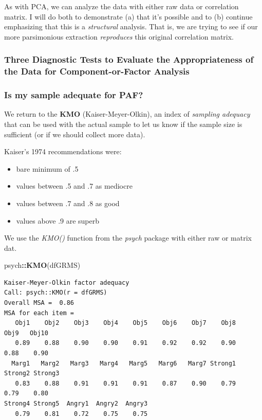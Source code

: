 \documentclass[
  english,
]{book}
\newenvironment{Shaded}{\begin{snugshade}}{\end{snugshade}}
\newcommand{\KeywordTok}[1]{\textcolor[rgb]{0.13,0.29,0.53}{\textbf{#1}}}
\newcommand{\NormalTok}[1]{#1}
\newcommand{\OperatorTok}[1]{\textcolor[rgb]{0.81,0.36,0.00}{\textbf{#1}}}
\providecommand{\tightlist}{%
  \setlength{\itemsep}{0pt}\setlength{\parskip}{0pt}}
\begin{document}
As with PCA, we can analyze the data with either raw data or correlation matrix. I will do both to demonstrate (a) that it's possible and to (b) continue emphasizing that this is a \emph{structural} analysis. That is, we are trying to see if our more parsimonious extraction \emph{reproduces} this original correlation matrix.

\hypertarget{three-diagnostic-tests-to-evaluate-the-appropriateness-of-the-data-for-component-or-factor-analysis-1}{%
\subsubsection{Three Diagnostic Tests to Evaluate the Appropriateness of the Data for Component-or-Factor Analysis}\label{three-diagnostic-tests-to-evaluate-the-appropriateness-of-the-data-for-component-or-factor-analysis-1}}

\hypertarget{is-my-sample-adequate-for-paf}{%
\subsubsection{Is my sample adequate for PAF?}\label{is-my-sample-adequate-for-paf}}

We return to the \textbf{KMO} (Kaiser-Meyer-Olkin), an index of \emph{sampling adequacy} that can be used with the actual sample to let us know if the sample size is sufficient (or if we should collect more data).

Kaiser's 1974 recommendations were:

\begin{itemize}
\tightlist
\item
  bare minimum of .5
\item
  values between .5 and .7 as mediocre
\item
  values between .7 and .8 as good
\item
  values above .9 are superb
\end{itemize}

We use the \emph{KMO()} function from the \emph{psych} package with either raw or matrix dat.

\begin{Shaded}
\begin{Highlighting}[]
\NormalTok{psych}\OperatorTok{::}\KeywordTok{KMO}\NormalTok{(dfGRMS)}
\end{Highlighting}
\end{Shaded}

\begin{verbatim}
Kaiser-Meyer-Olkin factor adequacy
Call: psych::KMO(r = dfGRMS)
Overall MSA =  0.86
MSA for each item = 
   Obj1    Obj2    Obj3    Obj4    Obj5    Obj6    Obj7    Obj8    Obj9   Obj10 
   0.89    0.88    0.90    0.90    0.91    0.92    0.92    0.90    0.88    0.90 
  Marg1   Marg2   Marg3   Marg4   Marg5   Marg6   Marg7 Strong1 Strong2 Strong3 
   0.83    0.88    0.91    0.91    0.91    0.87    0.90    0.79    0.79    0.80 
Strong4 Strong5  Angry1  Angry2  Angry3 
   0.79    0.81    0.72    0.75    0.75 
\end{verbatim}
\end{document}
